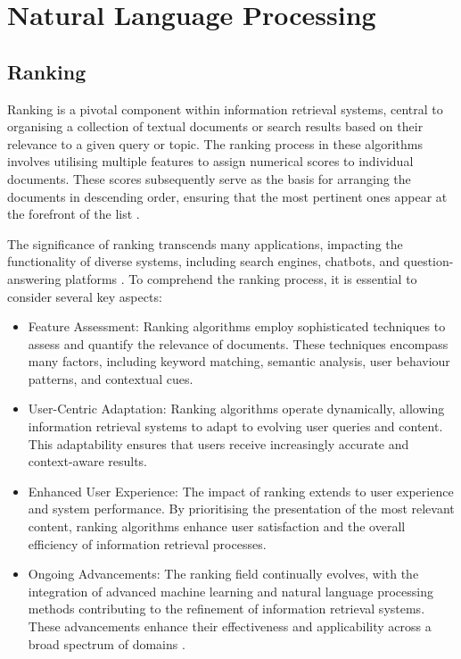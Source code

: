 \section{Natural Language Processing}
\subsection{Ranking}
Ranking is a pivotal component within information retrieval systems, central to organising a collection of textual documents or search results based on their relevance to a given query or topic. The ranking process in these algorithms involves utilising multiple features to assign numerical scores to individual documents. These scores subsequently serve as the basis for arranging the documents in descending order, ensuring that the most pertinent ones appear at the forefront of the list \cite{wu}.

The significance of ranking transcends many applications, impacting the functionality of diverse systems, including search engines, chatbots, and question-answering platforms \cite{nlp}. To comprehend the ranking process, it is essential to consider several key aspects:

\begin{itemize}
    \item Feature Assessment: Ranking algorithms employ sophisticated techniques to assess and quantify the relevance of documents. These techniques encompass many factors, including keyword matching, semantic analysis, user behaviour patterns, and contextual cues.
    \item User-Centric Adaptation: Ranking algorithms operate dynamically, allowing information retrieval systems to adapt to evolving user queries and content. This adaptability ensures that users receive increasingly accurate and context-aware results.
    \item Enhanced User Experience: The impact of ranking extends to user experience and system performance. By prioritising the presentation of the most relevant content, ranking algorithms enhance user satisfaction and the overall efficiency of information retrieval processes.
    \item Ongoing Advancements: The ranking field continually evolves, with the integration of advanced machine learning and natural language processing methods contributing to the refinement of information retrieval systems. These advancements enhance their effectiveness and applicability across a broad spectrum of domains \cite{nlp}.
\end{itemize}

